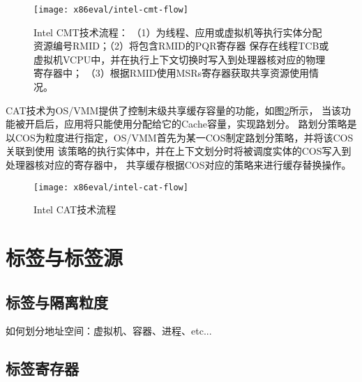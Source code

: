 \begin{figure}[H]
  \centering
  \texttt{[image: x86eval/intel-cmt-flow]}
  \caption[Intel Cache Monitor Technology (CMT) 技术流程]{Intel CMT技术流程：
   （1）为线程、应用或虚拟机等执行实体分配资源编号RMID；（2）将包含RMID的PQR寄存器
   保存在线程TCB或虚拟机VCPU中，并在执行上下文切换时写入到处理器核对应的物理寄存器中；
   （3）根据RMID使用MSRs寄存器获取共享资源使用情况。}
  \label{fig:intel-cmt-flow}
\end{figure}

CAT技术为OS/VMM提供了控制末级共享缓存容量的功能，如图\ref{fig:intel-cat-flow}所示，
当该功能被开启后，应用将只能使用分配给它的Cache容量，实现路划分。
路划分策略是以COS为粒度进行指定，OS/VMM首先为某一COS制定路划分策略，并将该COS关联到使用
该策略的执行实体中，并在上下文划分时将被调度实体的COS写入到处理器核对应的寄存器中，
共享缓存根据COS对应的策略来进行缓存替换操作。

\begin{figure}[H]
  \centering
  \texttt{[image: x86eval/intel-cat-flow]}
  \caption[Intel Cache Allocation Technology (CAT) 技术流程]{Intel CAT技术流程}
  \label{fig:intel-cat-flow}
\end{figure}


\section{标签与标签源}


\subsection{标签与隔离粒度}

如何划分地址空间：虚拟机、容器、进程、etc...

\subsection{标签寄存器}


